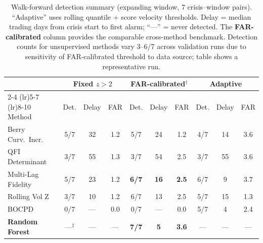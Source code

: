 \documentclass[3p]{elsarticle}
\begin{document}
\begin{table}[htb]
\centering
\caption{Walk-forward detection summary (expanding window, 7 crisis--window
  pairs).  ``Adaptive'' uses rolling quantile + score velocity
  thresholds.  Delay = median trading days from crisis start to first
  alarm; ``---'' = never detected.  The \textbf{FAR-calibrated} column
  provides the comparable cross-method benchmark.  Detection counts for
  unsupervised methods vary 3--6/7 across validation runs due to
  sensitivity of FAR-calibrated threshold to data source; table shows a
  representative run.}
\label{tab:walkforward}
\small
\begin{tabular}{lccccccccc}
\toprule
 & \multicolumn{3}{c}{Fixed $z > 2$} & \multicolumn{3}{c}{\textbf{FAR-calibrated}$^\dagger$} & \multicolumn{3}{c}{Adaptive} \\
\cmidrule(lr){2-4} \cmidrule(lr){5-7} \cmidrule(lr){8-10}
Method & Det. & Delay & FAR & Det. & Delay & FAR & Det. & Delay & FAR \\
\midrule
Berry Curv.\ Incr.   & 5/7 & 32 & 1.2 & 5/7 & 24 & 1.2 & 4/7 & 14 & 3.6 \\
QFI Determinant       & 3/7 & 55 & 1.3 & 3/7 & 54 & 2.5 & 3/7 & 55 & 3.6 \\
Multi-Lag Fidelity    & 5/7 & 23 & 1.2 & \textbf{6/7} & \textbf{16} & \textbf{2.5} & 6/7 & 9 & 3.7 \\
Rolling Vol Z         & 3/7 & 10 & 1.2 & 6/7 & 13 & 2.5 & 5/7 & 15 & 1.3 \\
BOCPD                 & 0/7 & --- & 0.0 & 0/7 & --- & 0.0 & 5/7 & 4 & 2.4 \\
\textbf{Random Forest} & ---$^\ddagger$ & --- & --- & \textbf{7/7} & \textbf{5} & \textbf{3.6} & --- & --- & --- \\
\bottomrule
\end{tabular}

\medskip
{}
\end{table}
\end{document}
